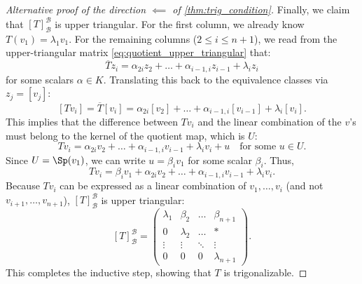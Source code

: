 \begin{proof}[Alternative proof of the direction $\impliedby$ of \cref{thm:trig_condition}]
  Finally, we claim that $[T]_{\mathcal{B}}^{\mathcal{B}}$ is upper triangular.
  For the first column, we already know $T(v_1) = \lambda_1 v_1$.
  For the remaining columns ($2 \le i \le n+1$), we read from the upper-triangular matrix \eqref{eq:quotient_upper_triangular} that:
  \[ \overline{T} z_i = \alpha_{2i}z_2 + \dots + \alpha_{i-1, i}z_{i-1} + \lambda_i z_i \]
  for some scalars $\alpha \in K$. Translating this back to the equivalence classes via $z_j = [v_j]$:
  \[ [T v_i] = \overline{T}[v_i] = \alpha_{2i}[v_2] + \dots + \alpha_{i-1, i}[v_{i-1}] + \lambda_i [v_i]. \]
  This implies that the difference between $Tv_i$ and the linear combination of the $v$'s must belong to the kernel of the quotient map, which is $U$:
  \[ Tv_i = \alpha_{2i}v_2 + \dots + \alpha_{i-1, i}v_{i-1} + \lambda_i v_i + u \quad \text{for some } u \in U. \]
  Since $U = \Sp(v_1)$, we can write $u = \beta_i v_1$ for some scalar $\beta_i$. Thus,
  \[ Tv_i = \beta_i v_1 + \alpha_{2i}v_2 + \dots + \alpha_{i-1, i}v_{i-1} + \lambda_i v_i. \]
  Because $Tv_i$ can be expressed as a linear combination of $v_1, \dots, v_i$ (and not $v_{i+1}, \dots, v_{n+1}$), $[T]_{\mathcal{B}}^{\mathcal{B}}$ is upper triangular:
  \[ [T]_{\mathcal{B}}^{\mathcal{B}} = \begin{pmatrix} \lambda_1 & \beta_2 & \dots & \beta_{n+1} \\ 0 & \lambda_2 & \dots & * \\ \vdots & \vdots & \ddots & \vdots \\ 0 & 0 & 0 & \lambda_{n+1} \end{pmatrix}. \]
  This completes the inductive step, showing that $T$ is trigonalizable.
\end{proof}


